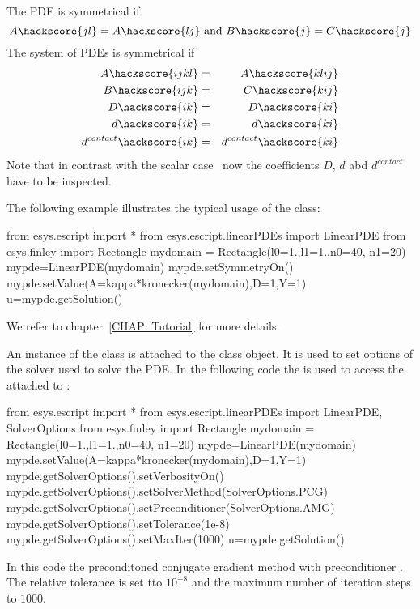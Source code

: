 The PDE is symmetrical  if
\begin{equation}\label{LINEARPDE.SINGLE.4}
A\hackscore{jl}=A\hackscore{lj} \mbox{ and } B\hackscore{j}=C\hackscore{j}
\end{equation}
The system of PDEs is symmetrical  if
\begin{eqnarray}
\label{LINEARPDE.SYSTEM.4}
A\hackscore{ijkl}&=&A\hackscore{klij} \\
B\hackscore{ijk}&=&C\hackscore{kij} \\
D\hackscore{ik}&=&D\hackscore{ki} \\
d\hackscore{ik}&=&d\hackscore{ki} \\
d^{contact}\hackscore{ik}&=&d^{contact}\hackscore{ki}
\end{eqnarray}
Note that in contrast with the scalar case~ now the coefficients $D$, $d$ abd $d^{contact}$
have to be inspected.

The following example illustrates the typical usage of the \LinearPDE class:
\begin{python}
from esys.escript import *
from esys.escript.linearPDEs import LinearPDE
from esys.finley import Rectangle
mydomain = Rectangle(l0=1.,l1=1.,n0=40, n1=20)
mypde=LinearPDE(mydomain)
mypde.setSymmetryOn()
mypde.setValue(A=kappa*kronecker(mydomain),D=1,Y=1)
u=mypde.getSolution()
\end{python}
We refer to chapter~\ref{CHAP: Tutorial} for more details.

An instance of the \SolverOptions class is attached to the \LinearPDE class object. It is used to set options of the solver used to solve the PDE. In the following
code the  is used to access the  \SolverOptions 
attached to :
\begin{python}
from esys.escript import *
from esys.escript.linearPDEs import LinearPDE, SolverOptions
from esys.finley import Rectangle
mydomain = Rectangle(l0=1.,l1=1.,n0=40, n1=20)
mypde=LinearPDE(mydomain)
mypde.setValue(A=kappa*kronecker(mydomain),D=1,Y=1)
mypde.getSolverOptions().setVerbosityOn()
mypde.getSolverOptions().setSolverMethod(SolverOptions.PCG)
mypde.getSolverOptions().setPreconditioner(SolverOptions.AMG)
mypde.getSolverOptions().setTolerance(1e-8)
mypde.getSolverOptions().setMaxIter(1000)
u=mypde.getSolution()
\end{python}
In this code the preconditoned conjugate gradient method \PCG
with preconditioner \AMG. The relative tolerance is set tto $10^{-8}$ and
the maximum number of iteration steps to $1000$.

